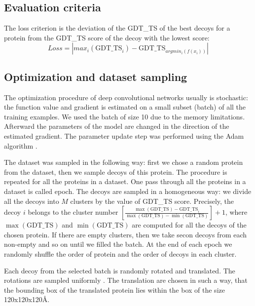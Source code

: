 \subsection{Evaluation criteria}
The loss criterion is the deviation of the GDT\_TS of the best decoys for a protein from the GDT\_TS score of the decoy with the lowest score:
$$ 
Loss = | max_i( \text{GDT\_TS}_i ) - \text{GDT\_TS}_{argmin_i(f(x_i))} |
$$ 

\subsection{Optimization and dataset sampling}
The optimization procedure of deep convolutional networks usually is stochastic: the function value and gradient 
is estimated on a small subset (batch) of all the training 
examples. We used the batch of size 10 due to the memory limitations. Afterward the parameters of the model are 
changed in the direction of the estimated gradient.
The parameter update step was performed using the Adam algorithm \cite{kingma2014adam}. 

The dataset was sampled in the following way: first we chose a random protein from the dataset, then we sample decoys of this protein. 
The procedure is repeated for all the 
proteins in a dataset. One pass through all the proteins in a dataset is called epoch. 
The decoys are sampled in a homogeneous way: we divide all the decoys into $M$ clusters by the value of GDT\_TS score. 
Precisely, the decoy $i$ belongs to the cluster  
number $ \left[ \frac{\max(\text{GDT\_TS}) - \text{GDT\_TS}_i}{\max(\text{GDT\_TS}) - \min(\text{GDT\_TS})} \right] + 1$, 
where $\max(\text{GDT\_TS})$ and $\min(\text{GDT\_TS})$ are computed for all the decoys of 
the chosen protein. If there are empty clusters, then we take secon decoys from each non-empty and so on until we filled the batch. 
At the end of each epoch we randomly shuffle the order of protein and the order of decoys in each cluster. 

Each decoy from the selected batch is randomly rotated and translated. The rotations are sampled uniformly \cite{shoemake1992uniform}. 
The translation are chosen in such a way, that the bounding box of the translated protein lies within the box of the size 120x120x120\AA. 

